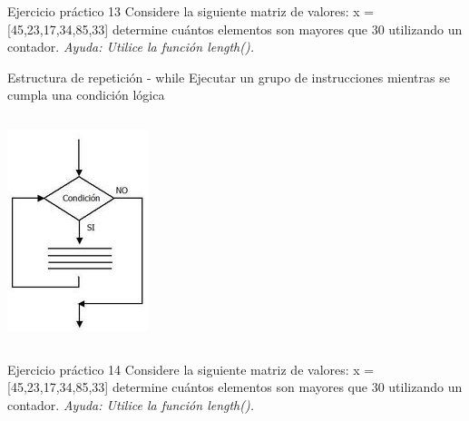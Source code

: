 \documentclass{bredelebeamer}
\begin{document}
\begin{frame}{Ejercicio práctico 13}
Considere la siguiente matriz de valores: x = [45,23,17,34,85,33] determine cuántos elementos son mayores que 30 utilizando un contador. \textit{Ayuda: Utilice la función length().}
\end{frame}

\begin{frame}{Estructura de repetición - while}
Ejecutar un grupo de instrucciones mientras se cumpla una condición lógica
\begin{columns}
\begin{column}{0.5\textwidth}
\begin{center}
\includegraphics[scale=0.7]{images/pantalla9.png}
\end{center}
\end{column}
\begin{column}{0.5\textwidth}

\end{column}
\end{columns}
\end{frame}

\begin{frame}{Ejercicio práctico 14}
Considere la siguiente matriz de valores: x = [45,23,17,34,85,33] determine cuántos elementos son mayores que 30 utilizando un contador. \textit{Ayuda: Utilice la función length().}
\end{frame}
\end{document}
